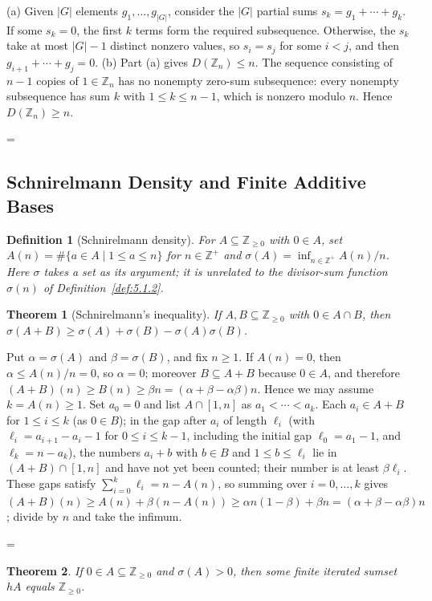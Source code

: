 \documentclass[11pt]{article}
\makeatletter
\theoremstyle{ntstyle}
\newtheorem{theorem}{Theorem}[subsection]
\newtheorem{definition}{Definition}[subsection]
\let\nt@closedisplay\]
\def\nt@guardedclose{\@ifnextchar\par{\nt@closeafterpar}{\@ifnextchar\end{\postdisplaypenalty\@M\nt@closedisplay}{\nt@closedisplay}}}
\def\nt@closeafterpar\par{\@ifnextchar\par{\nt@closeafterpar}{\@ifnextchar\end{\postdisplaypenalty\@M\nt@closedisplay\par}{\nt@closedisplay\par}}}
\renewenvironment{proof}[1][\proofname]{\par
  \pushQED{\qed}\normalfont\topsep\medskipamount\edef\nt@afterproof{\@endparpenalty=\the\@endparpenalty\relax}\@beginparpenalty\@M\@endparpenalty\@M\let\]\nt@guardedclose\trivlist\item[]\textit{#1\@addpunct{.}} \ignorespaces}{\ifvmode\addpenalty\@M\fi\popQED\nt@afterproof\endtrivlist\@endpefalse}
\makeatother
\begin{document}
\begin{proof} (a) Given $|G|$ elements $g_1, \ldots,
		g_{|G|}$, consider the $|G|$ partial sums $s_k = g_1 + \cdots + g_k$.
	If some $s_k = 0$, the first $k$ terms form the required subsequence.
	Otherwise, the $s_k$ take at most $|G| - 1$ distinct nonzero values,
	so $s_i = s_j$ for some $i < j$, and then $g_{i+1} + \cdots + g_j =
		0$. (b) Part (a) gives $D(\mathbb{Z}_n)\le n$. The sequence
	consisting of $n - 1$ copies of $1\in\mathbb{Z}_n$ has no nonempty
	zero-sum subsequence: every nonempty subsequence has sum $k$ with
	$1\le k\le n - 1$, which is nonzero modulo $n$. Hence
	$D(\mathbb{Z}_n)\ge n$.

\end{proof}
\subsection{Schnirelmann Density and Finite Additive Bases}

\begin{definition}[Schnirelmann density]\label{def:12.4.1} For
	$A\subseteq\mathbb{Z}_{\ge0}$ with $0\in A$, set $A(n)=\#\{a\in
		A \mid 1\le a\le n\}$ for $n\in\mathbb{Z}^+$ and
	$\sigma(A)=\inf_{n\in\mathbb{Z}^+}A(n)/n$. Here $\sigma$
	takes a set as its argument; it is unrelated to the divisor-sum function
	$\sigma(n)$ of Definition~\ref{def:5.1.2}.

\end{definition}
\begin{theorem}[Schnirelmann's inequality]\label{thm:12.4.1} If
	$A,B\subseteq\mathbb{Z}_{\ge0}$ with $0\in A\cap B$, then $\sigma(A+B)\ge\sigma(A)+\sigma(B)-\sigma(A)\sigma(B)$.

\end{theorem}

\begin{proof} Put $\alpha=\sigma(A)$ and
	$\beta=\sigma(B)$, and fix $n\ge1$. If $A(n)=0$, then
	$\alpha\le A(n)/n=0$, so $\alpha=0$; moreover $B\subseteq A+B$
	because $0\in A$, and therefore
	$(A+B)(n)\ge B(n)\ge\beta n=(\alpha+\beta-\alpha\beta)n$.
	Hence we may assume $k=A(n)\ge1$. Set $a_0=0$ and list
	$A\cap[1,n]$ as $a_1<\cdots<a_k$. Each
	$a_i\in A+B$ for $1\le i\le k$ (as $0\in B$); in the gap after $a_i$ of length
	$\ell_i$ (with $\ell_i=a_{i+1}-a_i-1$ for $0\le i\le k-1$, including
	the initial gap $\ell_0=a_1-1$, and $\ell_k=n-a_k$), the numbers $a_i+b$ with $b\in
		B$ and $1\le b\le\ell_i$ lie in $(A+B)\cap[1,n]$ and have not yet been counted; their number is
	at least $\beta\ell_i$. These gaps satisfy
	$\sum_{i=0}^{k}\ell_i=n-A(n)$, so summing over $i=0,\ldots,k$ gives $(A+B)(n)\ge A(n)+\beta(n-A(n))\ge\alpha
		n(1-\beta)+\beta n=(\alpha+\beta-\alpha\beta)n$; divide by $n$ and
	take the infimum.\qedhere

\end{proof}
\begin{theorem}\label{thm:12.4.2}
	If $0\in A\subseteq\mathbb{Z}_{\ge0}$ and $\sigma(A)>0$, then some
	finite iterated sumset $hA$ equals $\mathbb{Z}_{\ge0}$.

\end{theorem}
\end{document}
